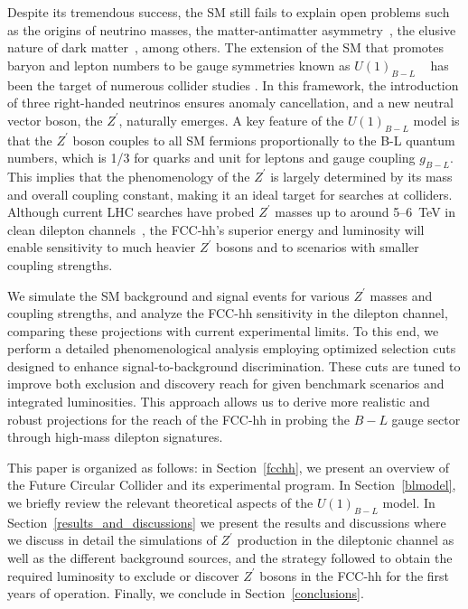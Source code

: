 \documentclass[aps,prev,twocolumn,preprintnumbers,floatfix,nofootinbib]{revtex4-1}
\begin{document}
Despite its tremendous success, the SM still fails to explain open problems such as the origins of neutrino masses, the matter-antimatter asymmetry~\cite{Cvetic:2021itw,Cvetic:2015naa,CarcamoHernandez:2022fvl,deJesus:2023lvn,Cogollo:2023twe}, the elusive nature of dark matter~\cite{Bertone:2004pz,Alves:2013tqa,Bertone:2016nfn,Arcadi:2017kky,Arcadi:2024ukq}, among others. The extension of the SM that promotes baryon and lepton numbers to be gauge symmetries known as \(U(1)_{B-L}\) ~\cite{Davidson:1978pm,Mohapatra:1979ia, Ma:1998dx,Mohapatra:1986bd} has been the target of numerous collider studies \cite{Emam:2007dy,Basso:2008iv,FileviezPerez:2009hdc,Li:2010rb,Arcadi:2013qia,Abdelalim:2014cxa,Alves:2015mua,Klasen:2016qux,Lindner:2016lpp,Lindner:2016bgg,VanDong:2018yae,Lindner:2018kjo,Camargo:2018uzw, Camargo:2018klg,Lindner:2020kko}. In this framework, the introduction of three right-handed neutrinos ensures anomaly cancellation, and a new neutral vector boson, the \(Z^\prime\), naturally emerges. A key feature of the \(U(1)_{B-L}\) model is that the \(Z^\prime\) boson couples to all SM fermions proportionally to the B-L quantum numbers, which is 1/3 for quarks and unit for leptons and gauge coupling $g_{B-L}$. This implies that the phenomenology of the \(Z^\prime\) is largely determined by its mass and overall coupling constant, making it an ideal target for searches at colliders. Although current LHC searches have probed \(Z^\prime\) masses up to around 5--6~TeV in clean dilepton channels~\cite{Cox:2017eme, CMS:2023ooo}, the FCC-hh's superior energy and luminosity will enable sensitivity to much heavier \(Z^\prime\) bosons and to scenarios with smaller coupling strengths.

We simulate the SM background and signal events for various \(Z^\prime\) masses and coupling strengths, and analyze the FCC-hh sensitivity in the dilepton channel, comparing these projections with current experimental limits. To this end, we perform a detailed phenomenological analysis employing optimized selection cuts designed to enhance signal-to-background discrimination. These cuts are tuned to improve both exclusion and discovery reach for given benchmark scenarios and integrated luminosities. This approach allows us to derive more realistic and robust projections for the reach of the FCC-hh in probing the \(B-L\) gauge sector through high-mass dilepton signatures. 

This paper is organized as follows: in Section~\ref{fcchh}, we present an overview of the Future Circular Collider and its experimental program. In Section~\ref{blmodel}, we briefly review the relevant theoretical aspects of the \(U(1)_{B-L}\) model. In Section~\ref{results_and_discussions} we present the results and discussions where we discuss in detail the simulations of $Z^\prime$ production in the dileptonic channel as well as the different background sources, and the strategy followed to obtain the required luminosity to exclude or discover $Z^\prime$ bosons in the FCC-hh for the first years of operation. Finally, we conclude in Section~\ref{conclusions}. \newline
\end{document}
